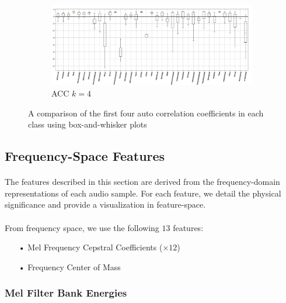 \documentclass[12pt,letterpaper]{article}
\begin{document}
\begin{figure}[H]
\begin{center}
	\begin{subfigure}{1.0\textwidth}
	\centering
	\includegraphics[width=\textwidth , height=0.2\textheight]
		{../FiguresFeatures/ACC_4}
	\caption{ACC $k=4$}
	\end{subfigure}	
	
\end{center}
\caption{A comparison of the first four auto correlation coefficients in each class using box-and-whisker plots}
\label{fig-FeatureACC}
\end{figure}


\newpage

\subsection{Frequency-Space Features}
\label{subsec-FreqFeatures}

\paragraph*{}The features described in this section are derived from the frequency-domain representations of each audio sample.
For each feature, we detail the physical significance and provide a visualization in feature-space.

\paragraph*{}From frequency space, we use the following $13$ features:
\begin{itemize}
\item[•] Mel Frequency Cepstral Coefficients ($\times 12$)
\item[•] Frequency Center of Mass
\end{itemize}


\subsubsection{Mel Filter Bank Energies}
\end{document}
